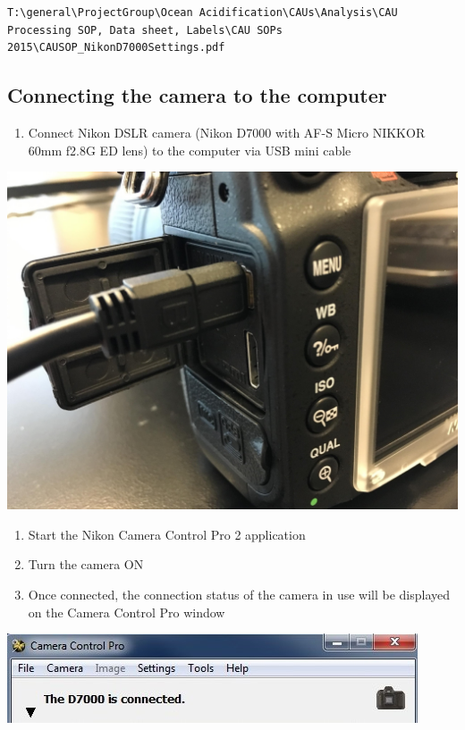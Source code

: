 \documentclass[
]{book}
\providecommand{\tightlist}{%
  \setlength{\itemsep}{0pt}\setlength{\parskip}{0pt}}
\begin{document}
\begin{verbatim}
T:\general\ProjectGroup\Ocean Acidification\CAUs\Analysis\CAU Processing SOP, Data sheet, Labels\CAU SOPs 2015\CAUSOP_NikonD7000Settings.pdf
\end{verbatim}

\hypertarget{connecting-the-camera-to-the-computer}{%
\subsection{Connecting the camera to the computer}\label{connecting-the-camera-to-the-computer}}

\begin{enumerate}
\def\labelenumi{\arabic{enumi}.}
\tightlist
\item
  Connect Nikon DSLR camera (Nikon D7000 with AF-S Micro NIKKOR 60mm f2.8G ED lens) to the computer via USB mini cable
\end{enumerate}

\includegraphics{images/Camera.jpg}

\begin{enumerate}
\def\labelenumi{\arabic{enumi}.}
\setcounter{enumi}{1}
\item
  Start the Nikon Camera Control Pro 2 application
\item
  Turn the camera ON
\item
  Once connected, the connection status of the camera in use will be displayed on the Camera Control Pro window
\end{enumerate}

\includegraphics{images/Camera2.jpg}
\end{document}
